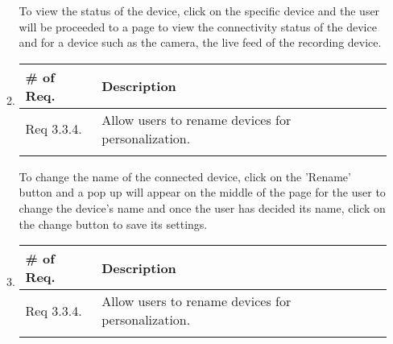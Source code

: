 \begin{enumerate}[label=\arabic*.]
\begin{enumerate}[label=\alph*]
              To view the status of the device, click on the specific device and the user will be proceeded to a page to view the connectivity status of the device and for a device such as the camera, the live feed of the recording device. \\
              \item 
              \begin{table}[H]
                        \center
                        \begin{tabular}{m{1.4cm} m{5.5cm}}
                            \toprule
                            \# of Req. & Description                                                                                                                   \\
                            \midrule
                            Req 3.3.4.   & Allow users to rename devices for personalization. \\\\
                            \bottomrule
                        \end{tabular}
                    \end{table}
                
              To change the name of the connected device, click on the 'Rename' button and a pop up will appear on the middle of the page for the user to change the device's name and once the user has decided its name, click on the change button to save its settings. \\
              \item 
              \begin{table}[H]
                        \center
                        \begin{tabular}{m{1.4cm} m{5.5cm}}
                            \toprule
                            \# of Req. & Description                                                                                                                   \\
                            \midrule
                            Req 3.3.4.   & Allow users to rename devices for personalization. \\\\
                            \bottomrule
                        \end{tabular}
                    \end{table}
                

\end{enumerate}
\end{enumerate}
